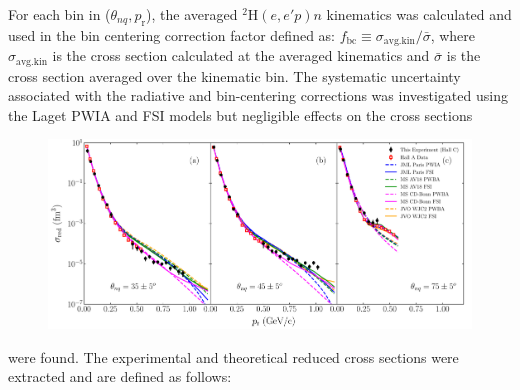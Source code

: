 For each bin in ($\theta_{nq}, p_{\mathrm{r}}$), the averaged $^{2}\mathrm{H}(e,e'p)n$ kinematics was calculated and used in the bin centering correction factor defined as:
$f_{\mathrm{bc}} \equiv \sigma_{\mathrm{avg.kin}} / \bar{\sigma}$, where $\sigma_{\mathrm{avg.kin}}$ is the cross section calculated at the averaged kinematics and $\bar{\sigma}$ is the cross section averaged
over the kinematic bin. The systematic uncertainty associated with the radiative and bin-centering corrections was investigated using the Laget PWIA and FSI models but negligible effects on the cross sections 
\DIFaddbegin \onecolumngrid
\begin{center}
\begin{figure}
\includegraphics[scale=0.46]{prl_plots/PRL_plot1.pdf}
\caption{}
\label{fig:fig1}
\end{figure}
\end{center}
\twocolumngrid
\noindent \DIFaddend were found. \DIFdelbegin %
\DIFdelend The experimental and theoretical reduced cross sections were extracted and are defined as follows:
\DIFdelbegin %
